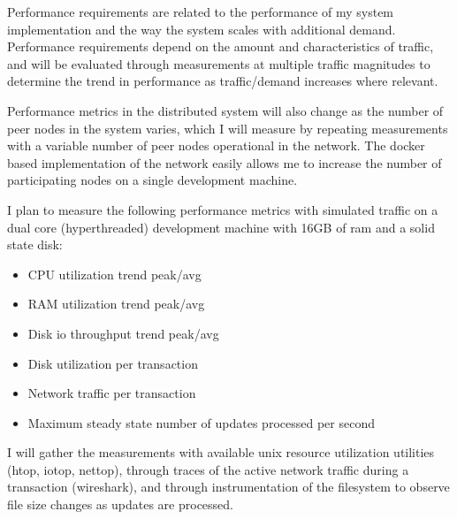 Performance requirements are related to the performance of my system
implementation and the way the system scales with additional
demand. Performance requirements depend on the amount and
characteristics of traffic, and will be evaluated through measurements
at multiple traffic magnitudes to determine the trend in performance
as traffic/demand increases where relevant.

Performance metrics in the distributed system will also change as the
number of peer nodes in the system varies, which I will measure by
repeating measurements with a variable number of peer nodes
operational in the network. The docker based implementation of the
network easily allows me to increase the number of participating
nodes on a single development machine.

I plan to measure the following performance metrics with simulated
traffic on a dual core (hyperthreaded) development machine with 16GB
of ram and a solid state disk:
\begin{itemize}
\item CPU utilization trend peak/avg
\item RAM utilization trend peak/avg
\item Disk io throughput trend peak/avg
\item Disk utilization per transaction
\item Network traffic per transaction
\item Maximum steady state number of updates processed per second
\end{itemize}

I will gather the measurements with available unix resource
utilization utilities (htop, iotop, nettop), through traces of the
active network traffic during a transaction (wireshark), and through
instrumentation of the filesystem to observe file size changes as
updates are processed.

